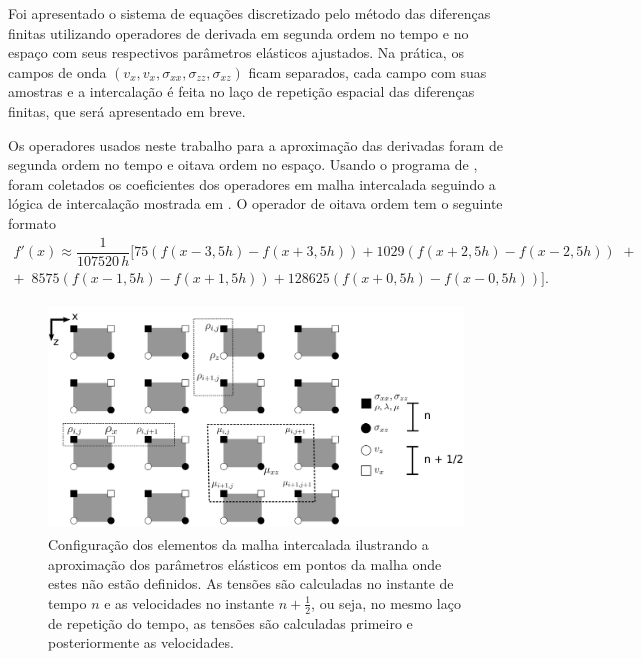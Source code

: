 \documentclass[
	12pt,				%
	openright,			%
	oneside,			%
	a4paper,			%
	english,			%
	brazil				%
	]{abntex2}
\begin{document}
	Foi apresentado o sistema de equações discretizado pelo método das diferenças finitas utilizando operadores de derivada em segunda ordem no tempo e no espaço com seus respectivos parâmetros elásticos ajustados. Na prática, os campos de onda $(v_x,v_x,\sigma_{xx},\sigma_{zz},\sigma_{xz})$ ficam separados, cada campo com suas amostras e a intercalação é feita no laço de repetição espacial das diferenças finitas, que será apresentado em breve.
 	
 	Os operadores usados neste trabalho para a aproximação das derivadas foram de segunda ordem no tempo e oitava ordem no espaço. Usando o programa de , foram coletados os coeficientes dos operadores em malha intercalada seguindo a lógica de intercalação mostrada em . O operador de oitava ordem tem o seguinte formato
%
 	\begin{equation}
		\begin{split}
			f'(x) \approx \dfrac{1}{107520\,h}[75(f(x-3,5h)-f(x+3,5h)) + 1029(f(x+2,5h)-f(x-2,5h))\,\,+\\
			+\,\,\, 8575(f(x-1,5h)-f(x+1,5h)) + 128625(f(x+0,5h)-f(x-0,5h))].				
		\end{split}	
 	\end{equation}
% 	 
    \begin{figure}[htp!]
		\centering
		\includegraphics[width=11cm,height=6cm]{../imagens/staggeredGridElements.png}
		\caption{Configuração dos elementos da malha intercalada ilustrando a aproximação dos parâmetros elásticos em pontos da malha onde estes não estão definidos. As tensões são calculadas no instante de tempo $n$ e as velocidades no instante $n+\frac{1}{2}$, ou seja, no mesmo laço de repetição do tempo, as tensões são calculadas primeiro e posteriormente as velocidades.}
		\label{staggeredGridElements}
	\end{figure}
\end{document}
